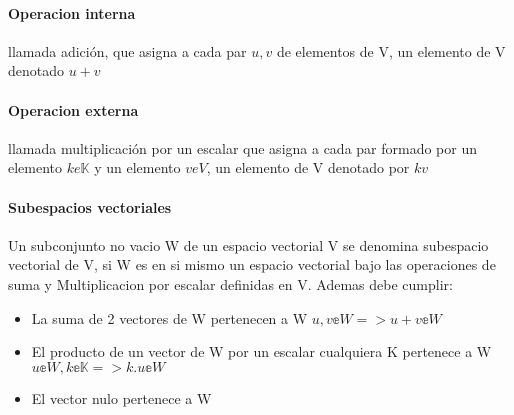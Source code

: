 \documentclass[10pt]{article}
\begin{document}
\paragraph{Operacion interna}llamada adición, que asigna a cada par 
$u,v$ de elementos de V, un elemento de V denotado $u+v$

\paragraph{Operacion externa}llamada multiplicación por un escalar que 
asigna a cada par formado por un elemento $ke\mathbb{K}$ y un elemento $veV$, un elemento de V denotado por $kv$

\paragraph{Subespacios vectoriales}

Un subconjunto no vacio W de un espacio vectorial V se denomina subespacio vectorial
de V, si W es en si mismo un espacio vectorial bajo las operaciones de suma y Multiplicacion
por escalar definidas en V. Ademas debe cumplir:

\begin{itemize}
    \item La suma de 2 vectores de W pertenecen a W
    $u,v \mathbb{e} W => u + v \mathbb{e} W$
    \item El producto de un vector de W por un escalar cualquiera K pertenece a W
    $u \mathbb{e} W, k \mathbb{e} \mathbb{K} => k.u  \mathbb{e} W$
    \item El vector nulo pertenece a W 
\end{itemize}
\end{document}
